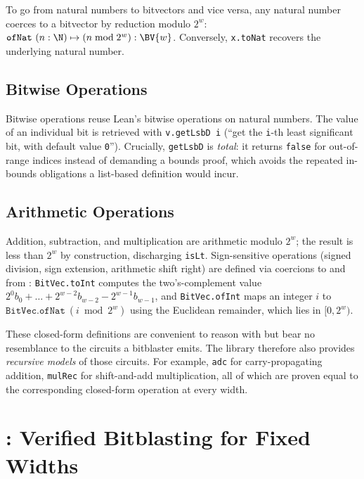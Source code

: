 To go from natural numbers to bitvectors and vice versa,
any natural number coerces to a bitvector by reduction modulo $2^w$:
$\texttt{ofNat}\ (n : \N) \mapsto (n \bmod 2^w) : \BV{w}$. Conversely,
\texttt{x.toNat} recovers the underlying natural number.

\subsection{Bitwise Operations}

Bitwise operations reuse Lean's bitwise operations on natural numbers. The
value of an individual bit is retrieved with \texttt{v.getLsbD i} (``get the
\texttt{i}-th least significant bit, with default value \texttt{0}'').
Crucially, \texttt{getLsbD} is \emph{total}: it returns \texttt{false} for out-of-range
indices instead of demanding a bounds proof, which avoids the repeated
in-bounds obligations a list-based definition would incur.

\subsection{Arithmetic Operations}

Addition, subtraction, and multiplication are arithmetic modulo $2^w$; the
result is less than $2^w$ by construction, discharging \texttt{isLt}.
Sign-sensitive operations (signed division, sign extension, arithmetic shift right)
are defined via coercions to and from \Z{}:
\texttt{BitVec.toInt} computes the two's-complement value $2^0 b_0 + \dots + 2^{w-2}b_{w-2} - 2^{w-1}b_{w-1}$, and \texttt{BitVec.ofInt}
maps an integer $i$ to $\texttt{BitVec.ofNat}\ (i \bmod 2^w)$ using the
Euclidean remainder, which lies in $[0, 2^w)$.

These closed-form definitions are convenient to reason with but bear no
resemblance to the circuits a bitblaster emits. The library therefore also
provides \emph{recursive models} of those circuits.
For example, \texttt{adc} for carry-propagating addition, \texttt{mulRec} for shift-and-add multiplication,
all of which are proven equal to the corresponding closed-form operation at every width.

\section{\texorpdfstring{\bvdecide{}}{bv\_decide}: Verified Bitblasting for Fixed Widths}
\label{sec:bg:bvdecide}

